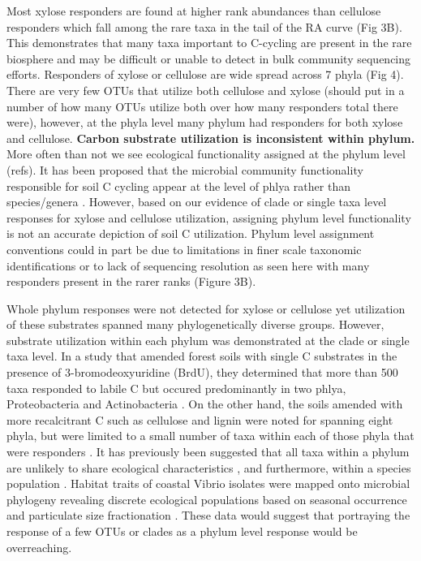 Most xylose responders are found at higher rank abundances than cellulose responders which fall among the rare taxa in the tail of the RA curve (Fig 3B). This demonstrates that many taxa important to C-cycling are present in the rare biosphere and may be difficult or unable to detect in bulk community sequencing efforts. Responders of xylose or cellulose are wide spread across 7 phyla (Fig 4). There are very few OTUs that utilize both cellulose and xylose (should put in a number of how many OTUs utilize both over how many responders total there were), however, at the phyla level many phylum had responders for both xylose and cellulose.
\textbf{Carbon substrate utilization is inconsistent within phylum.} More often than not we see ecological functionality assigned at the phylum level (refs). It has been proposed that the microbial community functionality responsible for soil C cycling appear at the level of phlya rather than species/genera \cite{Schimel_2012}. However, based on our evidence of clade or single taxa level responses for xylose and cellulose utilization, assigning phylum level functionality is not an accurate depiction of soil C utilization. Phylum level assignment conventions could in part be due to limitations in finer scale taxonomic identifications or to lack of sequencing resolution as seen here with many responders present in the rarer ranks (Figure 3B). 

Whole phylum responses were not detected for xylose or cellulose yet utilization of these substrates spanned many phylogenetically diverse groups. However, substrate utilization within each phylum was demonstrated at the clade or single taxa level. In a study that amended forest soils with single C substrates in the presence of 3-bromodeoxyuridine (BrdU), they determined that more than 500 taxa responded to labile C but occured predominantly in two phlya, Proteobacteria and Actinobacteria \cite{Goldfarb_2011}. On the other hand, the soils amended with more recalcitrant C such as cellulose and lignin were noted for spanning eight phyla, but were limited to a small number of taxa within each of those phyla that were responders \cite{Goldfarb_2011}. It has previously been suggested that all taxa within a phylum are unlikely to share ecological characteristics \cite{Fierer_2007}, and furthermore, within a species population \cite{Choudoir_2012,Preheim_2011,Hunt_2008}. Habitat traits of coastal Vibrio isolates were mapped onto microbial phylogeny revealing discrete ecological populations based on seasonal occurrence and particulate size fractionation \cite{Preheim_2011, Hunt_2008}. These data would suggest that portraying the response of a few OTUs or clades as a phylum level response would be overreaching.     

